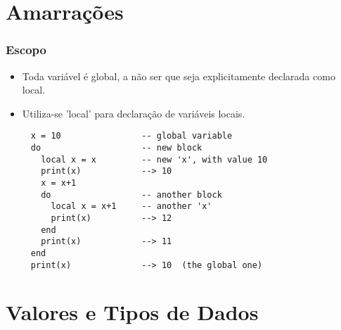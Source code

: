 \documentclass{ime-beamer}
\begin{document}
\section{Amarrações}
\begin{frame}[fragile]
  \frametitle{Escopo}
  \begin{block}{}
      \centering
      \begin{itemize}
        \item Toda variável é global, a não ser que seja explicitamente
          declarada como local. 
        \item Utiliza-se 'local' para declaração de variáveis locais.
      \end{itemize}
  \end{block}
  \begin{block}{}
    \begin{lstlisting}
     x = 10                -- global variable
     do                    -- new block
       local x = x         -- new 'x', with value 10
       print(x)            --> 10
       x = x+1
       do                  -- another block
         local x = x+1     -- another 'x'
         print(x)          --> 12
       end
       print(x)            --> 11
     end
     print(x)              --> 10  (the global one)
    \end{lstlisting}
  \end{block}
\end{frame}

\section{Valores e Tipos de Dados}
\end{document}
